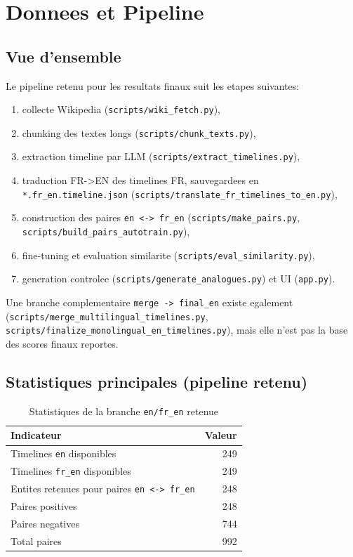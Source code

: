 ﻿\chapter{Donnees et Pipeline}

\section{Vue d'ensemble}
Le pipeline retenu pour les resultats finaux suit les etapes suivantes:
\begin{enumerate}[leftmargin=2em]
  \item collecte Wikipedia (\texttt{scripts/wiki\_fetch.py}),
  \item chunking des textes longs (\texttt{scripts/chunk\_texts.py}),
  \item extraction timeline par LLM (\texttt{scripts/extract\_timelines.py}),
  \item traduction FR->EN des timelines FR, sauvegardees en \texttt{*.fr\_en.timeline.json}
        (\texttt{scripts/translate\_fr\_timelines\_to\_en.py}),
  \item construction des paires \texttt{en <-> fr\_en}
        (\texttt{scripts/make\_pairs.py}, \texttt{scripts/build\_pairs\_autotrain.py}),
  \item fine-tuning et evaluation similarite (\texttt{scripts/eval\_similarity.py}),
  \item generation controlee (\texttt{scripts/generate\_analogues.py}) et UI (\texttt{app.py}).
\end{enumerate}

Une branche complementaire \texttt{merge -> final\_en} existe egalement
(\texttt{scripts/merge\_multilingual\_timelines.py},
\texttt{scripts/finalize\_monolingual\_en\_timelines.py}),
mais elle n'est pas la base des scores finaux reportes.

\section{Statistiques principales (pipeline retenu)}
\begin{table}[H]
  \centering
  \caption{Statistiques de la branche \texttt{en/fr\_en} retenue}
  \begin{tabular}{lr}
    \toprule
    Indicateur & Valeur \\
    \midrule
    Timelines \texttt{en} disponibles & 249 \\
    Timelines \texttt{fr\_en} disponibles & 249 \\
    Entites retenues pour paires \texttt{en <-> fr\_en} & 248 \\
    Paires positives & 248 \\
    Paires negatives & 744 \\
    Total paires & 992 \\
    \bottomrule
  \end{tabular}
\end{table}

